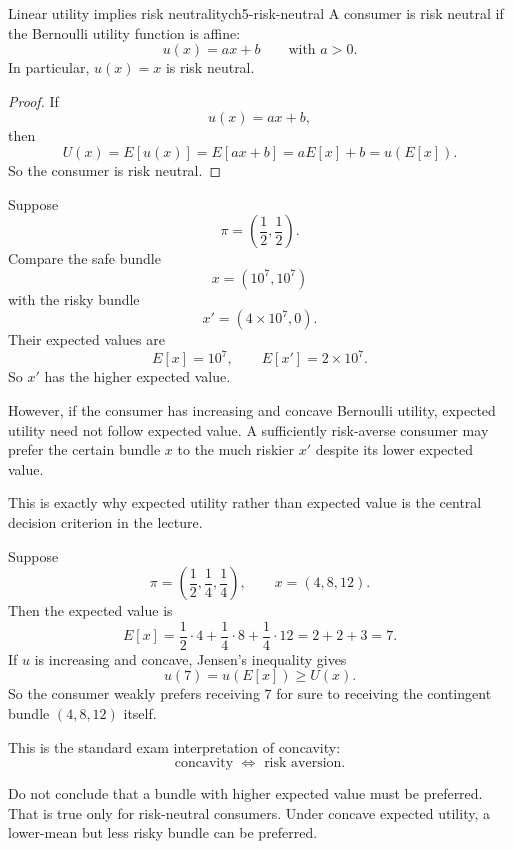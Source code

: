 \begin{theorem}{Linear utility implies risk neutrality}{ch5-risk-neutral}
A consumer is risk neutral if the Bernoulli utility function is affine:
\[
u(x)=ax+b
\qquad \text{with } a>0.
\]
In particular, $u(x)=x$ is risk neutral.
\end{theorem}

\begin{proof}
If
\[
u(x)=ax+b,
\]
then
\[
U(x)=E[u(x)] = E[ax+b] = aE[x]+b = u(E[x]).
\]
So the consumer is risk neutral.
\end{proof}

\begin{examplebox}[title={Worked Example: same expected value, different risk}]
Suppose
\[
\pi=\left(\frac12,\frac12\right).
\]
Compare the safe bundle
\[
x=(10^7,10^7)
\]
with the risky bundle
\[
x'=(4\times 10^7,0).
\]
Their expected values are
\[
E[x]=10^7,
\qquad
E[x']=2\times 10^7.
\]
So $x'$ has the higher expected value.

However, if the consumer has increasing and concave Bernoulli utility, expected utility need not follow expected value. A sufficiently risk-averse consumer may prefer the certain bundle $x$ to the much riskier $x'$ despite its lower expected value.

This is exactly why expected utility rather than expected value is the central decision criterion in the lecture.
\end{examplebox}

\begin{examplebox}[title={Worked Example: certainty equivalent under concavity}]
Suppose
\[
\pi=\left(\frac12,\frac14,\frac14\right),
\qquad
x=(4,8,12).
\]
Then the expected value is
\[
E[x]=\frac12\cdot 4 + \frac14\cdot 8 + \frac14\cdot 12 = 2+2+3=7.
\]
If $u$ is increasing and concave, Jensen's inequality gives
\[
u(7) = u(E[x]) \ge U(x).
\]
So the consumer weakly prefers receiving $7$ for sure to receiving the contingent bundle $(4,8,12)$ itself.

This is the standard exam interpretation of concavity:
\[
\boxed{\text{concavity } \Longleftrightarrow \text{ risk aversion}.}
\]
\end{examplebox}

\begin{commonmistake}
Do not conclude that a bundle with higher expected value must be preferred. That is true only for risk-neutral consumers. Under concave expected utility, a lower-mean but less risky bundle can be preferred.
\end{commonmistake}

